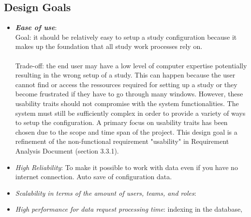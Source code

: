 \subsection{Design Goals}

\begin{itemize}
\item \textit{\bf{Ease of use}}: 
\\
Goal: it should be relatively easy to setup a study configuration because it makes up the foundation that all study work processes rely on. 
\\\\
Trade-off: the end user may have a low level of computer expertise potentially resulting in the wrong setup of a study.  This can happen because the user cannot find or access the ressources required for setting up a study or they become frustrated if they have to go through many windows. However, these usability traits should not compromise with the system functionalities. The system must still be sufficiently complex in order to provide a variety of ways to setup the configuration.  A primary focus on usability traits has been chosen due to the scope and time span of the project. This design goal is a refinement of the non-functional requirement  "usability" in Requirement Analysis Document  (section 3.3.1). 
\item \textit{High Reliability}: To make it possible to work with data even if you have no internet connection. Auto save of configuration data.
\item \textit{Scalability in terms of the amount of users, teams, and roles}:
\item \textit{High performance for data request processing time}: indexing in the database, 
\end{itemize}
